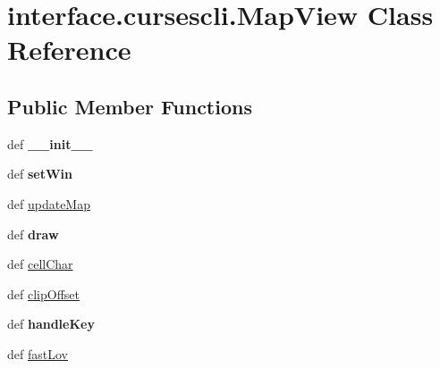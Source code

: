 \hypertarget{classinterface_1_1cursescli_1_1_map_view}{\section{interface.\-cursescli.\-Map\-View \-Class \-Reference}
\label{classinterface_1_1cursescli_1_1_map_view}
}
\subsection*{\-Public \-Member \-Functions}
\begin{DoxyCompactItemize}
\item 
\hypertarget{classinterface_1_1cursescli_1_1_map_view_ab01484a5b5c8ca9d5c779bee1ef6d710}{def {\bfseries \-\_\-\-\_\-init\-\_\-\-\_\-}}\label{classinterface_1_1cursescli_1_1_map_view_ab01484a5b5c8ca9d5c779bee1ef6d710}

\item 
\hypertarget{classinterface_1_1cursescli_1_1_map_view_ae4868812e622acf9cb0da05ecbd17ea5}{def {\bfseries set\-Win}}\label{classinterface_1_1cursescli_1_1_map_view_ae4868812e622acf9cb0da05ecbd17ea5}

\item 
def \hyperlink{classinterface_1_1cursescli_1_1_map_view_ad761d937ddcdad5ed32cdcbccc70cbb1}{update\-Map}
\item 
\hypertarget{classinterface_1_1cursescli_1_1_map_view_a73a675f44f28cfae9a11f631fa7a972b}{def {\bfseries draw}}\label{classinterface_1_1cursescli_1_1_map_view_a73a675f44f28cfae9a11f631fa7a972b}

\item 
def \hyperlink{classinterface_1_1cursescli_1_1_map_view_acf3f62c908193e8f80710f78af3ef8a6}{cell\-Char}
\item 
def \hyperlink{classinterface_1_1cursescli_1_1_map_view_a7365f14995f5e7edb9fe110e65080672}{clip\-Offset}
\item 
\hypertarget{classinterface_1_1cursescli_1_1_map_view_a37487d0d1d8a28471673c3f7b456f1dc}{def {\bfseries handle\-Key}}\label{classinterface_1_1cursescli_1_1_map_view_a37487d0d1d8a28471673c3f7b456f1dc}

\item 
def \hyperlink{classinterface_1_1cursescli_1_1_map_view_aa1bdbf7ace6bbaebec6896e8742d3641}{fast\-Lov}
\end{DoxyCompactItemize}

